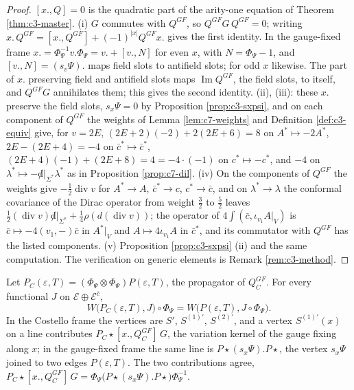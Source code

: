 \begin{proof}
$[x.,Q]=0$ is the quadratic part of the arity-one equation of Theorem \ref{thm:c3-master}. (i) $G$ commutes with $Q^{GF}$, so $Q^{GF}G\,Q^{GF}=0$; writing $x.\,Q^{GF}=[x.,Q^{GF}]+(-1)^{|x|}Q^{GF}x.$ gives the first identity. In the gauge-fixed frame $x.=\Phi_\Psi^{-1}v.\Phi_\Psi=v.+[v.,N]$ for even $x$, with $N=\Phi_\Psi-1$, and $[v.,N]=(s_v\Psi).$ maps field slots to antifield slots; for odd $x$ likewise. The part of $x.$ preserving field and antifield slots maps $\operatorname{Im}Q^{GF}$, the field slots, to itself, and $Q^{GF}G$ annihilates them; this gives the second identity. (ii), (iii): these $x.$ preserve the field slots, $s_x\Psi=0$ by Proposition \ref{prop:c3-sxpsi}, and on each component of $Q^{GF}$ the weights of Lemma \ref{lem:c7-weights} and Definition \ref{def:c3-equiv} give, for $v=2E$, $(2E+2)(-2)+2(2E+6)=8$ on $A^*\mapsto-2A^*$, $2E-(2E+4)=-4$ on $\bar c^*\mapsto\bar c^*$, $(2E+4)(-1)+(2E+8)=4=-4\cdot(-1)$ on $c^*\mapsto-c^*$, and $-4$ on $\lambda^*\mapsto-{\not d}|_{\Sigma^*}\lambda^*$ as in Proposition \ref{prop:c7-dil}. (iv) On the components of $Q^{GF}$ the weights give $-\tfrac12\operatorname{div}v$ for $A^*\to A$, $\bar c^*\to c$, $c^*\to\bar c$, and on $\lambda^*\to\lambda$ the conformal covariance of the Dirac operator from weight $\tfrac32$ to $\tfrac52$ leaves $\tfrac12(\operatorname{div}v){\not d}|_{\Sigma^*}+\tfrac14\rho(d(\operatorname{div}v))$; the operator of $4\int(\bar c,\iota_{v_1}A|_V)$ is $\bar c\mapsto-4(v_1,-)\bar c$ in $A^*|_V$ and $A\mapsto4\iota_{v_1}A$ in $\bar c^*$, and its commutator with $Q^{GF}$ has the listed components. (v) Proposition \ref{prop:c3-sxpsi} (ii) and the same computation. The verification on generic elements is Remark \ref{rem:c3-method}.
\end{proof}

\begin{proposition}
\label{prop:c3-twodescr}
Let $P_C(\varepsilon,T)=(\Phi_\Psi\otimes\Phi_\Psi)P(\varepsilon,T)$, the propagator of $Q^{GF}_C$. For every functional $J$ on $\mathscr E\oplus\mathscr E^{\bar c}$,
\[
W\big(P_C(\varepsilon,T),J\big)\circ\Phi_\Psi=W\big(P(\varepsilon,T),J\circ\Phi_\Psi\big).
\]
In the Costello frame the vertices are $S'$, $S^{(1)\prime}$, $S^{(2)\prime}$, and a vertex $S^{(1)\prime}(x)$ on a line contributes $P_C\star[x.,Q^{GF}_C]\,G$, the variation kernel of the gauge fixing along $x$; in the gauge-fixed frame the same line is $P\star(s_x\Psi).P\star$, the vertex $s_x\Psi$ joined to two edges $P(\varepsilon,T)$. The two contributions agree, $P_C\star[x.,Q^{GF}_C]\,G=\Phi_\Psi\big(P\star(s_x\Psi).P\star\big)\Phi_\Psi^{-1}$.
\end{proposition}

